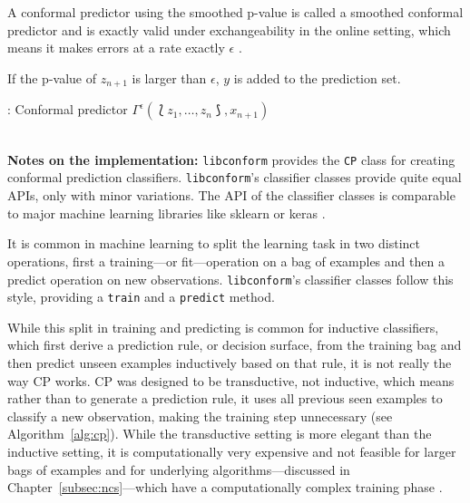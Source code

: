 \documentclass[twoside,11pt]{article}
\def\libconform{\texttt{libconform}}
\def\wo{~\\}
\begin{document}
A conformal predictor using the smoothed p-value is called
a smoothed conformal predictor and is exactly valid under
exchangeability in the online setting, which means it makes
errors at a rate exactly $\epsilon$
\citep[see][Chapter 2]{alrw}.

If the p-value of $z_{n+1}$ is larger than $\epsilon$, $y$
is added to the prediction set.

\begin{algorithm}
  \caption{: Conformal predictor $\Gamma^\epsilon
    (\Lbag z_1,\dots,z_n \Rbag, x_{n+1})$}
  \label{alg:cp}

  \begin{algorithmic}[1]
      \ENDFOR
      \ENDIF
    \ENDFOR
  \end{algorithmic}
\end{algorithm}
\wo

\noindent
\textbf{Notes on the implementation:}
\libconform{} provides the \texttt{CP} class for creating
conformal prediction classifiers. \libconform{}'s
classifier classes provide quite equal APIs, only with
minor variations.
The API of the classifier classes is comparable to major
machine learning libraries like sklearn or keras
\citep[see][]{sklearn_api, keras}.

It is common in machine learning to split the learning task
in two distinct operations, first a
training---or fit---operation on a bag of examples
and then a predict operation on new observations.
\libconform{}'s classifier classes follow this style,
providing a \texttt{train} and a \texttt{predict} method.

While this split in training and predicting is common for
inductive classifiers, which first derive a prediction
rule, or decision surface, from the training bag and then
predict unseen examples inductively based on that rule,
it is not really the way CP works. CP was designed to be
transductive, not inductive, which means rather than
to generate a prediction rule, it uses all previous seen
examples to classify a new observation, making the training
step unnecessary (see Algorithm~\ref{alg:cp}).
While the transductive setting is more elegant than the
inductive setting, it is computationally very expensive and
not feasible for larger bags of examples and for underlying
algorithms---discussed in Chapter~\ref{subsec:ncs}---which
have a computationally complex training phase
\citep[see][Chapter 1]{papadopoulos_et_al_2007,alrw}.
\end{document}
